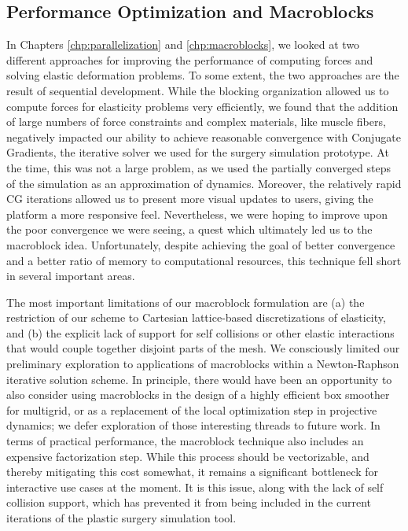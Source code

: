 \subsection{Performance Optimization and Macroblocks}

In Chapters \ref{chp:parallelization} and \ref{chp:macroblocks}, we
looked at two different approaches for improving the performance of
computing forces and solving elastic deformation problems. To some
extent, the two approaches are the result of sequential
development. While the blocking organization allowed us to compute
forces for elasticity problems very efficiently, we found that the
addition of large numbers of force constraints and complex materials,
like muscle fibers, negatively impacted our ability to achieve
reasonable convergence with Conjugate Gradients, the iterative solver
we used for the surgery simulation prototype. At the time, this
was not a large problem, as we used the partially converged steps of
the simulation as an approximation of dynamics. Moreover, the
relatively rapid CG iterations allowed us to present more visual
updates to users, giving the platform a more responsive
feel. Nevertheless, we were hoping to improve upon the poor
convergence we were seeing, a quest which ultimately led us to the
macroblock idea. Unfortunately, despite achieving the goal of better
convergence and a better ratio of memory to computational resources,
this technique fell short in several important areas.

The most important limitations of our macroblock formulation are (a)
the restriction of our scheme to Cartesian lattice-based
discretizations of elasticity, and (b) the explicit lack of support
for self collisions or other elastic interactions that would couple
together disjoint parts of the mesh. We consciously limited our
preliminary exploration to applications of macroblocks within a
Newton-Raphson iterative solution scheme. In principle, there would
have been an opportunity to also consider using macroblocks in the
design of a highly efficient box smoother for multigrid, or as a
replacement of the local optimization step in projective dynamics; we
defer exploration of those interesting threads to future work. In
terms of practical performance, the macroblock technique also includes
an expensive factorization step. While this process should be
vectorizable, and thereby mitigating this cost somewhat, it remains a
significant bottleneck for interactive use cases at the moment. It is
this issue, along with the lack of self collision support, which has
prevented it from being included in the current iterations of the
plastic surgery simulation tool.

